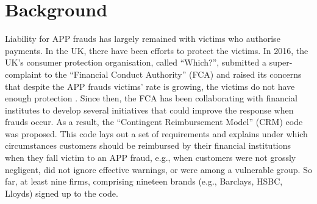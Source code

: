 


\section{Background}\label{sec::background}



Liability for  APP frauds has largely remained with victims who authorise payments. In the UK,  there have been efforts to protect the victims. In  2016, the UK's consumer protection organisation, called ``Which?'', submitted a super-complaint to the
 ``Financial Conduct Authority” (FCA) and raised its concerns that despite the APP frauds victims' rate is growing, the victims do not have enough protection \cite{Which?-super-complaint}.  Since then, the FCA has been collaborating with financial institutes to develop several initiatives that
could improve the response when frauds occur. As a result,  the ``Contingent Reimbursement Model'' (CRM)  code  \cite{CRM-code} was proposed. This code lays out a set of requirements and explains under which circumstances customers should be reimbursed by their financial institutions when they fall victim to an APP fraud, e.g., when customers were not grossly negligent, did not ignore effective warnings, or were among a vulnerable group. So far,  at least nine firms, comprising nineteen brands (e.g., Barclays, HSBC,  Lloyds) signed up to the code. 


